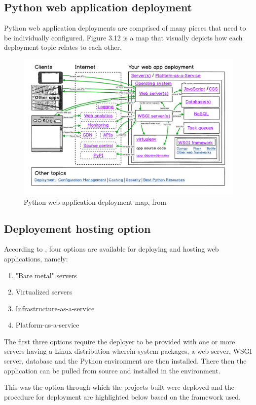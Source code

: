\subsection{Python web application deployment}
Python web application deployments are comprised of many pieces that need to be individually configured. Figure 3.12 is a map that visually depicts how each deployment topic relates to each other.
\begin{figure}[!htbp]
	\centering
	\includegraphics[width=1\textwidth]{./deploy.png}
	\caption{Python web application deployment map, from \citet{Makai:2020}}
\end{figure}
\subsection{Deployement hosting option}
According to \citet{Makai:2020}, four options are available for deploying and hosting web applications, namely:
\begin{enumerate}
	\item "Bare metal" servers
	\item Virtualized servers
	\item Infrastructure-as-a-service
	\item Platform-as-a-service
\end{enumerate}
The first three options require the deployer to be provided with one or more servers having a Linux distribution wherein system packages, a web server, \ac{WSGI} server, database and the Python environment are then installed. There then the application can be pulled from source and installed in the environment.

This was the option through which the projects built were deployed and the procedure for deployment are highlighted below based on the framework used.
